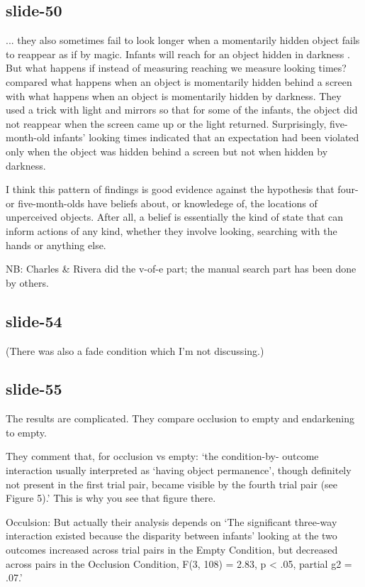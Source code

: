 \documentclass[12pt,\papersize]{extarticle}
\begin{document}
\subsection{slide-50}
... they also sometimes fail to look longer when a momentarily hidden object fails
to reappear as if by magic.
Infants will reach for an object hidden in darkness \citep[e.g.][]{jonsson:2003_infants}.
But what happens if instead of measuring reaching we measure looking times?
\citet{charles:2009_object} compared what happens when an object is
momentarily hidden behind a screen with what happens when an object is
momentarily hidden by darkness.
They used a trick with light and mirrors so that for some of the infants,
the object did not reappear when the screen came up or the light returned.
Surprisingly, five-month-old infants’ looking times indicated that an
expectation had been violated only when the object was hidden behind a
screen but not when hidden by darkness.

I think this pattern of findings is good evidence against the hypothesis
that four- or five-month-olds have beliefs about, or knowledege of,
the locations of
unperceived objects.
After all,
a belief is essentially the kind of state that can inform actions of any
kind, whether they involve looking, searching with the hands or anything
else.

NB: Charles \& Rivera did the v-of-e part; the manual search part has been
done by others.

\subsection{slide-54}
(There was also a fade condition which I’m not discussing.)

\subsection{slide-55}
The results are complicated.  They compare occlusion to empty
and endarkening to empty.

They comment that, for occlusion vs empty:
‘the condition-by- outcome interaction usually interpreted as ‘having
object permanence’, though definitely not present in the first trial pair,
became visible by the fourth trial pair (see Figure 5).’
This is why you see that figure there.

Occulsion: But actually their analysis depends on
‘The significant three-way interaction existed because the disparity
between infants’ looking at the two outcomes increased across trial pairs
in the Empty Condition, but decreased across pairs in the Occlusion
Condition, F(3, 108) = 2.83, p < .05, partial g2 = .07.’
\end{document}
